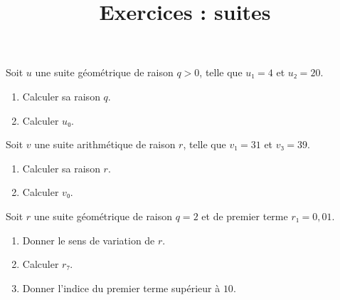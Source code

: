 \documentclass[
	classe=$1^{ere}STI2D$
]{exercice}
\title{Exercices : suites}
\begin{document}
\maketitle

\begin{exercice}
	Soit $u$ une suite géométrique de raison $q > 0$, telle que $u₁ = 4$ et $u₂ = 20$.

	\begin{enumerate}
		\item Calculer sa raison $q$.
		\item Calculer $u₀$.
	\end{enumerate}
\end{exercice}

\begin{exercice}
	Soit $v$ une suite arithmétique de raison $r$, telle que $v₁ = 31$ et $v₃ = 39$.

	\begin{enumerate}
		\item Calculer sa raison $r$.
		\item Calculer $v₀$.
	\end{enumerate}
\end{exercice}

\begin{exercice}
	Soit $r$ une suite géométrique de raison $q = 2$ et de premier terme $r₁ = 0,01$.

	\begin{enumerate}
		\item Donner le sens de variation de $r$.
		\item Calculer $r₇$.
		\item Donner l'indice du premier terme supérieur à $10$.
	\end{enumerate}
\end{exercice}
\end{document}
